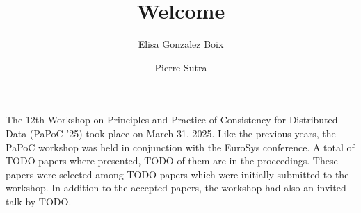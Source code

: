 \documentclass[acmlarge,nonacm]{acmart}
\newenvironment{RCText}[1][2em]
               {\begin{quoting}[leftmargin=#1,rightmargin=.5cm]\RaggedRight}
               {\end{quoting}}
\begin{document}
\title{Welcome}
\author{Elisa Gonzalez Boix}
\author{Pierre Sutra}
\authorsaddresses{}
\renewcommand{\shortauthors}{}
\maketitle

The 12th Workshop on Principles and Practice of Consistency for Distributed Data (PaPoC '25) took place on March 31, 2025.
Like the previous years, the PaPoC workshop was held in conjunction with the EuroSys conference.
A total of TODO papers where presented, TODO of them are in the proceedings.
These papers were selected among TODO papers which were initially submitted to the workshop.
In addition to the accepted papers, the workshop had also an invited talk by TODO. 


\medskip




\end{document}
